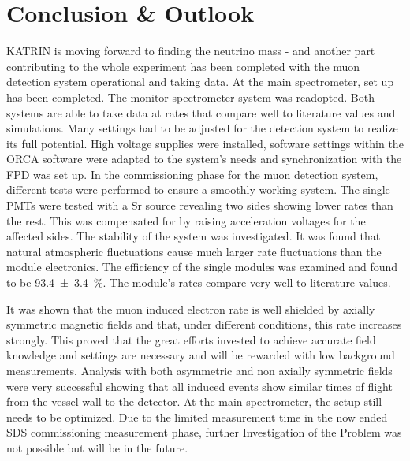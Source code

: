 
\chapter{Conclusion \& Outlook}
\label{ch:Conclusion}
KATRIN is moving forward to finding the neutrino mass - and another part contributing to the whole experiment has been completed with the muon detection system operational and taking data. 
At the main spectrometer, set up has been completed. The monitor spectrometer system was readopted. Both systems are able to take data at rates that compare well to literature values and simulations.
Many settings had to be adjusted for the detection system to realize its full potential. High voltage supplies were installed, software settings within the ORCA software were adapted to the system's needs and synchronization with the FPD was set up.
In the commissioning phase for the muon detection system, different tests were performed to ensure a smoothly working system. The single PMTs were tested with a Sr source revealing two sides showing lower rates than the rest. This was compensated for by raising acceleration voltages for the affected sides. The stability of the system was investigated. It was found that natural atmospheric fluctuations cause much larger rate fluctuations than the module electronics. The efficiency of the single modules was examined and found to be \SI{93.4 \pm 3.4}{\percent}. The module's rates compare very well to literature values. 

It was shown that the muon induced electron rate is well shielded by axially symmetric magnetic fields and that, under different conditions, this rate increases strongly. This proved that the great efforts invested to achieve accurate field knowledge and settings are necessary and will be rewarded with low background measurements.
Analysis with both asymmetric and non axially symmetric fields were very successful showing that all induced events show similar times of flight from the vessel wall to the detector. At the main spectrometer, the setup still needs to be optimized. Due to the limited measurement time in the now ended SDS commissioning measurement phase, further Investigation of the Problem was not possible but will be in the future.



